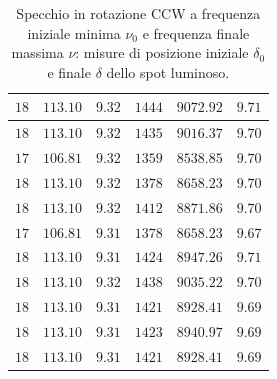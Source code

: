 \documentclass[]{article}
\begin{document}
\begin{table}
\begin{tabular}{||c|c|c||c|c|c||}
            $18$ & $113.10$ & $9.32$ & $1444$ & $9072.92$ & $9.71$ \\\hline
            $18$ & $113.10$ & $9.32$ & $1435$ & $9016.37$ & $9.70$ \\\hline
            $17$ & $106.81$ & $9.32$ & $1359$ & $8538.85$ & $9.70$ \\\hline
            $18$ & $113.10$ & $9.32$ & $1378$ & $8658.23$ & $9.70$ \\\hline
            $18$ & $113.10$ & $9.32$ & $1412$ & $8871.86$ & $9.70$ \\\hline
            $17$ & $106.81$ & $9.31$ & $1378$ & $8658.23$ & $9.67$ \\\hline
            $18$ & $113.10$ & $9.31$ & $1424$ & $8947.26$ & $9.71$ \\\hline
            $18$ & $113.10$ & $9.32$ & $1438$ & $9035.22$ & $9.70$ \\\hline
            $18$ & $113.10$ & $9.31$ & $1421$ & $8928.41$ & $9.69$ \\\hline
            $18$ & $113.10$ & $9.31$ & $1423$ & $8940.97$ & $9.69$ \\\hline
            $18$ & $113.10$ & $9.31$ & $1421$ & $8928.41$ & $9.69$ \\\hline
        \end{tabular}
        \caption{Specchio in rotazione CCW a frequenza iniziale minima $\nu_0$ e frequenza finale massima $\nu$: misure di posizione iniziale $\delta_0$ e finale $\delta$ dello spot luminoso.}
        \label{CCW_min_max-delta-omega}
    \end{table}
\end{document}

